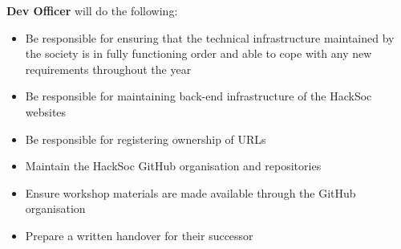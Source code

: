 \item \textbf{Dev Officer} will do the following: 
\begin{itemize}
  \item Be responsible for ensuring that the technical infrastructure maintained by the society is in fully functioning order and able to cope with any new requirements throughout the year
  \item Be responsible for maintaining back-end infrastructure of the HackSoc websites
  \item Be responsible for registering ownership of URLs
  \item Maintain the HackSoc GitHub organisation and repositories
  \item Ensure workshop materials are made available through the GitHub organisation
  \item Prepare a written handover for their successor
\end{itemize}